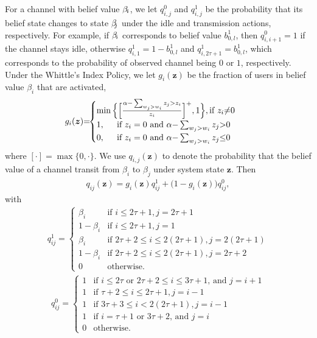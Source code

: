 \documentclass[11pt,twocolumn]{IEEEtran}
\begin{document}
For a channel with belief value $\beta_{\hspace{-1pt}i}$, we let $q_{i,j}^0$ and $q_{i,j}^1$ be the probability that its belief state changes to state $\beta_{\hspace{-2pt}j}$ under the idle and transmission actions, respectively. For example, if $\beta_{\hspace{-1pt}i}$ corresponds to belief value $b^1_{0,l}$, then $q^0_{i,i+1}=1$ if the channel stays idle, otherwise $q^1_{i,1}=1-b^1_{0,l}$ and $q^1_{i,2\tau+1}=b^1_{0,l}$, which corresponds to the probability of observed channel being $0$ or $1$, respectively. Under the Whittle's Index Policy, we let $g_i(\bm z)$ be the fraction of users in belief value $\beta_i$ that are activated,
\begin{align}
\label{eq:ran_factor}
\hspace{-8pt}g_i(\bm z){=}\hspace{-3pt}\begin{cases}
\min \Big\{\Big[\frac{\alpha{-}\sum_{w_j>w_i} z_j> z_i}{z_i}\Big]^+, 1 \Big\}, \text{if $z_i{\neq}0$}\\
1, \hspace{0.2in}\text{if $z_i = 0$ and $\alpha{-}\sum_{w_j>w_i} z_j{>}0$}\\
0, \hspace{0.2in}\text{if $z_i = 0$ and $\alpha{-}\sum_{w_j>w_i} z_j{\leq}0$}
\end{cases}
\end{align}
where $[\cdot]=\max\{0,\cdot\}$.  We use $q_{i,j}(\bm z)$ to denote the probability that the belief value of a channel transit from $\beta_i$ to $\beta_j$ under system state $\bm z$. Then
\begin{align}
\label{eq:qz}
q_{ij}(\bm z)=g_i(\bm z) q_{ij}^1+\big(1-g_i(\bm z)\big) q_{ij}^0,
\end{align}
with
\begin{align}
\nonumber
q_{ij}^1=\begin{cases}
\beta_i&\text{if $i\leq2\tau+1, j=2\tau+1$}\\
1-\beta_i&\text{if $i\leq2\tau+1, j=1$}\\
\beta_i&\text{if $2\tau{+}2{\leq} i{\leq}2(2\tau{+}1), j{=}2(2\tau{+}1)$}\\
1-\beta_i&\text{if $2\tau{+}2{\leq}i{\leq}2(2\tau{+}1), j{=}2\tau{+}2$}\\
0&\text{otherwise.}
\end{cases}
\end{align}
\begin{align}
\nonumber
q_{ij}^0=\begin{cases}
1&\text{if $i{\leq}2\tau$ or $2\tau{+}2{\leq}i{\leq}3\tau{+}1$, and $j{=}i{+}1$}\\
1&\text{if $\tau+2\leq i\leq 2\tau+1, j=i-1$}\\
1&\text{if $3\tau+3\leq i<2(2\tau+1), j=i-1$}\\
1&\text{if $i=\tau+1$ or $3\tau+2$, and $j=i$}\\
0&\text{otherwise.}
\end{cases}
\end{align}
\end{document}
